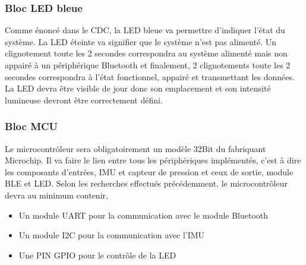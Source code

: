     \subsubsection{Bloc LED bleue}
        Comme énoncé dans le CDC, la LED bleue va permettre d'indiquer l'état du système. La LED éteinte va signifier que le système n'est pas alimenté. Un clignotement toute les 2 secondes correspondra au système alimenté mais non appairé à un périphérique Bluetooth et finalement, 2 clignotements toute les 2 secondes correspondra à l'état fonctionnel, appairé et transmettant les données. La LED devra être visible de jour donc son emplacement et son intensité lumineuse devront être correctement défini.\vspace{1cm}

    \subsubsection{Bloc MCU}
        Le microcontrôleur sera obligatoirement un modèle 32Bit du fabriquant Microchip. Il va faire le lien entre tous les périphériques implémentés, c'est à dire les composants d'entrées, IMU et capteur de pression et ceux de sortie, module BLE et LED.
        Selon les recherches effectués précédemment, le microcontrôleur devra au minimum contenir, \\
        \begin{itemize}
            \item Un module UART pour la communication avec le module Bluetooth
            \item Un module I2C pour la communication avec l'IMU
            \item Une PIN GPIO pour le contrôle de la LED
        \end{itemize}
        \vspace{1cm}

